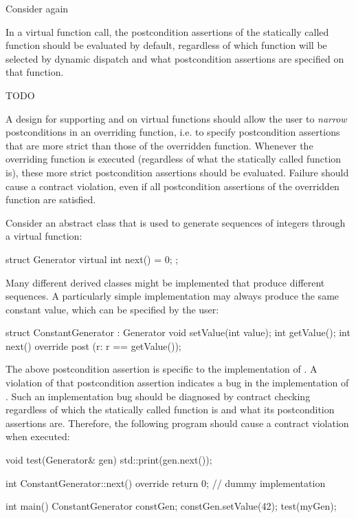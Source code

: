 Consider again 


In a virtual function call, the postcondition assertions of the statically called function should be evaluated by default, regardless of which function will be selected by dynamic dispatch and what postcondition assertions are specified on that function.

TODO



A design for supporting  and  on virtual functions should allow the user to \emph{narrow} postconditions in an overriding function, i.e. to specify postcondition assertions that are more strict than those of the overridden function. Whenever the overriding function is executed (regardless of what the statically called function is), these more strict postcondition assertions should be evaluated. Failure should cause a contract violation, even if all postcondition assertions of the overridden function are satisfied.

Consider an abstract class that is used to generate sequences of integers through a virtual function:

\begin{codeblock}
struct Generator {
  virtual int next() = 0;
};
\end{codeblock}
Many different derived classes might be implemented that produce different sequences. A particularly simple implementation may always produce the same constant value, which can be specified by the user:
\begin{codeblock}
struct ConstantGenerator : Generator {
  void setValue(int value);
  int getValue(); 
  int next() override
    post (r: r == getValue());
}
\end{codeblock}
The above postcondition assertion is specific to the implementation of \allowbreak{}. A violation of that postcondition assertion indicates a bug in the implementation of . Such an implementation bug should be diagnosed by contract checking regardless of which the statically called function is and what its postcondition assertions are. Therefore, the following program should cause a contract violation when executed:
\begin{codeblock}
void test(Generator& gen) {
  std::print(gen.next());
}

int ConstantGenerator::next() override {
  return 0;  // dummy implementation  
} 

int main() {
  ConstantGenerator constGen;
  constGen.setValue(42);
  test(myGen);
}
\end{codeblock}


